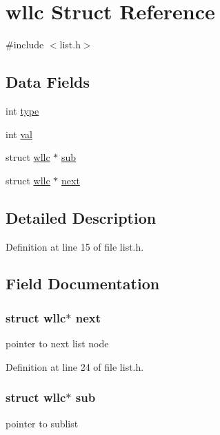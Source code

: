 \hypertarget{structwllc}{\section{wllc Struct Reference}
\label{structwllc}
}


{\ttfamily \#include $<$list.\-h$>$}

\subsection*{Data Fields}
\begin{DoxyCompactItemize}
\item 
int \hyperlink{structwllc_ac765329451135abec74c45e1897abf26}{type}
\item 
int \hyperlink{structwllc_aa0ccb5ee6d882ee3605ff47745c6467b}{val}
\item 
struct \hyperlink{structwllc}{wllc} $\ast$ \hyperlink{structwllc_a319f96acd55c98102c2b1d930deccda9}{sub}
\item 
struct \hyperlink{structwllc}{wllc} $\ast$ \hyperlink{structwllc_a1ecbbc980b73b974b2406091ee084188}{next}
\end{DoxyCompactItemize}


\subsection{Detailed Description}


Definition at line 15 of file list.\-h.



\subsection{Field Documentation}
\hypertarget{structwllc_a1ecbbc980b73b974b2406091ee084188}{
\subsubsection[{next}]{\setlength{\rightskip}{0pt plus 5cm}struct {\bf wllc}$\ast$ next}}\label{structwllc_a1ecbbc980b73b974b2406091ee084188}
pointer to next list node 

Definition at line 24 of file list.\-h.

\hypertarget{structwllc_a319f96acd55c98102c2b1d930deccda9}{
\subsubsection[{sub}]{\setlength{\rightskip}{0pt plus 5cm}struct {\bf wllc}$\ast$ sub}}\label{structwllc_a319f96acd55c98102c2b1d930deccda9}
pointer to sublist 


